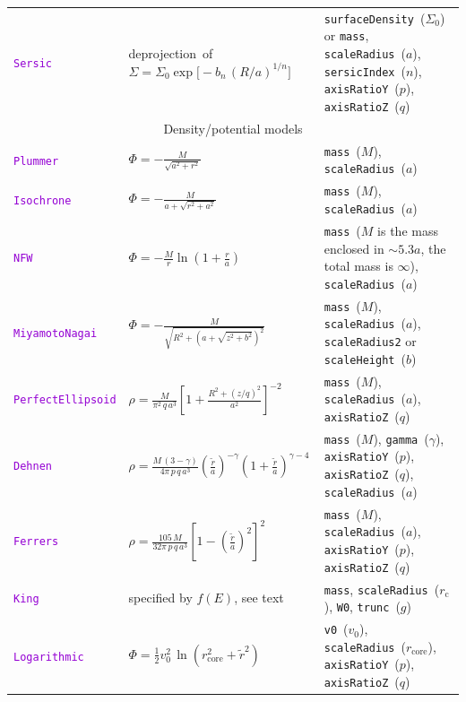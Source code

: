 \documentclass[12pt]{article}
\newcommand{\ttt}[1]{\textcolor{darkviolet}{\texttt{#1}}}
\newcommand{\ppp}[1]{\textcolor{darkolive} {\texttt{#1}}}
\begin{document}
\begin{table}
\begin{tabular}{l m{50mm} >{\raggedright\arraybackslash}m{80mm}}
\ttt{Sersic} & \mbox{deprojection of} \mbox{$\Sigma = \Sigma_0 \exp\big[-b_n\,(R/a)^{1/n}\big]$} & \ppp{surfaceDensity}~($\Sigma_0$) or \ppp{mass}, \ppp{scaleRadius}~($a$), \ppp{sersicIndex}~($n$), \ppp{axisRatioY}~($p$), \ppp{axisRatioZ}~($q$) \\[2mm]

\multicolumn{3}{c}{Density/potential models} \\

\ttt{Plummer} & $\Phi = -\frac{M}{\sqrt{a^2+r^2}}$ & \ppp{mass}~($M$), \ppp{scaleRadius}~($a$) \\[2mm]

\ttt{Isochrone} & $\Phi = - \frac{M}{a + \sqrt{r^2 + a^2}}$ & \ppp{mass}~($M$), \ppp{scaleRadius}~($a$) \\[2mm]

\ttt{NFW} & $\Phi = -\frac{M}{r} \ln\left(1 + \frac{r}{a}\right)$ & \ppp{mass}~($M$ {\footnotesize is the mass enclosed in $\sim5.3a$, the total mass is $\infty$}), \ppp{scaleRadius}~($a$) \\[2mm]

\ttt{MiyamotoNagai} & $\Phi = -\frac{M}{\sqrt{R^2 + \left(a + \sqrt{z^2+b^2}\right)^2}}$ & \ppp{mass}~($M$), \ppp{scaleRadius}~($a$), \ppp{scaleRadius2} or \ppp{scaleHeight}~($b$) \\[2mm]

\ttt{PerfectEllipsoid}\!\!\!\!\! & $\rho = \frac{M}{\pi^2\,q\,a^3} \left[ 1 + \frac{R^2+(z/q)^2}{a^2} \right]^{-2}$ &  \ppp{mass}~($M$), \ppp{scaleRadius}~($a$), \ppp{axisRatioZ}~($q$) \\[2mm]

\ttt{Dehnen} & $\rho = \frac{M\,(3-\gamma)}{4\pi\,p\,q\,a^3} \left(\frac{\tilde r}a\right)^{-\gamma} \left(1+\frac{\tilde r}a\right)^{\gamma-4}$\!\! &  \ppp{mass}~($M$), \ppp{gamma}~($\gamma$), \ppp{axisRatioY}~($p$), \ppp{axisRatioZ}~($q$), \ppp{scaleRadius}~($a$) \\[2mm]

\ttt{Ferrers} & $\rho = \frac{105\,M}{32\pi\,p\,q\,a^3} \left[1 - \left(\frac{\tilde r}a\right)^2\right]^2$ & \ppp{mass}~($M$), \ppp{scaleRadius}~($a$), \ppp{axisRatioY}~($p$), \ppp{axisRatioZ}~($q$) \\[2mm]

\ttt{King} & specified by $f(E)$, see text & 
\ppp{mass}, \ppp{scaleRadius}~($r_\mathrm{c}$), \ppp{W0}, \ppp{trunc}~($g$)
\\[1mm]

\ttt{Logarithmic} & $\Phi = \frac{1}{2} v_0^2\,\ln(r_\mathrm{core}^2 + \tilde r^2)$ & \ppp{v0}~($v_0$), \ppp{scaleRadius}~($r_\mathrm{core}$), \ppp{axisRatioY}~($p$), \ppp{axisRatioZ}~($q$) \\[2mm]


\end{tabular}
\end{table}
\end{document}

